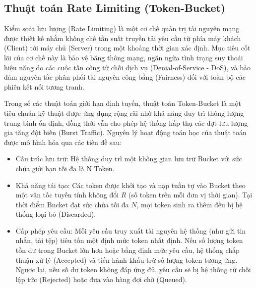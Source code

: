 \subsection{Thuật toán Rate Limiting (Token-Bucket)}

Kiểm soát lưu lượng (Rate Limiting) là một cơ chế quản trị tài nguyên mạng được thiết kế nhằm khống chế tần suất truyền tải yêu cầu từ phía máy khách (Client) tới máy chủ (Server) trong một khoảng thời gian xác định. Mục tiêu cốt lõi của cơ chế này là bảo vệ băng thông mạng, ngăn ngừa tình trạng suy thoái hiệu năng do các cuộc tấn công từ chối dịch vụ (Denial-of-Service - DoS), và bảo đảm nguyên tắc phân phối tài nguyên công bằng (Fairness) đối với toàn bộ các phiên kết nối tương tranh.

Trong số các thuật toán giới hạn định tuyến, thuật toán Token-Bucket là một tiêu chuẩn kỹ thuật được ứng dụng rộng rãi nhờ khả năng duy trì thông lượng trung bình ổn định, đồng thời vẫn cho phép hệ thống hấp thụ các đợt lưu lượng gia tăng đột biến (Burst Traffic). Nguyên lý hoạt động toán học của thuật toán được mô hình hóa qua các tiên đề sau:
\begin{itemize}[label={-}]
    \item Cấu trúc lưu trữ: Hệ thống duy trì một không gian lưu trữ Bucket với sức chứa giới hạn tối đa là N Token.
    \item Khả năng tái tạo: Các token được khởi tạo và nạp tuần tự vào Bucket theo một vận tốc tuyến tính không đổi $R$ (số token trên mỗi đơn vị thời gian). Tại thời điểm Bucket đạt sức chứa tối đa $N$, mọi token sinh ra thêm đều bị hệ thống loại bỏ (Discarded).
    \item Cấp phép yêu cầu: Mỗi yêu cầu truy xuất tài nguyên hệ thống (như gửi tin nhắn, tải tệp) tiêu tốn một định mức token nhất định. Nếu số lượng token tồn dư trong Bucket lớn hơn hoặc bằng định mức yêu cầu, hệ thống chấp thuận xử lý (Accepted) và tiến hành khấu trừ số lượng token tương ứng. Ngược lại, nếu số dư token không đáp ứng đủ, yêu cầu sẽ bị hệ thống từ chối lập tức (Rejected) hoặc đưa vào hàng đợi chờ (Queued).
\end{itemize}

